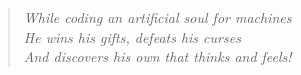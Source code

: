 
\begin{quote} 
\centering 
\textit{
    While coding an artificial soul for machines\\
    He wins his gifts, defeats his curses \\
    And discovers his own that thinks and feels!\\
    }
\end{quote}
